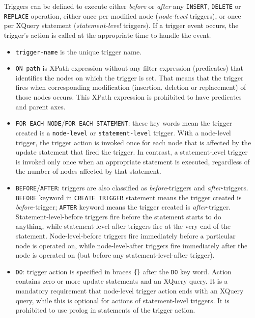 \documentclass[a4paper,12pt]{article}
\begin{document}
Triggers can be defined to execute either \emph{before} or \emph{after} any \verb!INSERT!, \verb!DELETE! or \verb!REPLACE! operation, either once per modified node (\emph{node-level} triggers), or once per XQuery statement (\emph{statement-level} triggers). If a trigger event occurs, the trigger's action is called at the appropriate time to handle the event.

\begin{itemize}
\item \verb!trigger-name! is the unique trigger name.

\item \verb!ON path! is XPath expression without any filter expression (predicates) that identifies the nodes on which the trigger is set. That means that the trigger fires when corresponding modification (insertion, deletion or replacement) of those nodes occurs. This XPath expression is prohibited to have predicates and parent axes.

\item \verb!FOR EACH NODE!/\verb!FOR EACH STATEMENT!: these key words mean the trigger created is a \verb!node-level! or \verb!statement-level! trigger. With a node-level trigger, the trigger action is invoked once for each node that is affected by the update statement that fired the trigger. In contrast, a statement-level trigger is invoked only once when an appropriate statement is executed, regardless of the number of nodes affected by that statement.

\item \verb!BEFORE!/\verb!AFTER!: triggers are also classified as \emph{before}-triggers and \emph{after}-triggers. \verb!BEFORE! keyword in \verb!CREATE TRIGGER! statement means the trigger created is \emph{before}-trigger; \verb!AFTER! keyword means the trigger created is \emph{after}-trigger. Statement-level-before triggers fire before the statement starts to do anything, while statement-level-after triggers fire at the very end of the statement. Node-level-before triggers fire immediately before a particular node is operated on, while node-level-after triggers fire immediately after the node is operated on (but before any statement-level-after trigger).

\item \verb!DO!: trigger action is specified in braces \verb!{}! after the \verb!DO! key word. Action contains zero or more update statements and an XQuery query. It is a mandatory requirement that node-level trigger action  ends with an XQuery query, while this is optional for actions of statement-level triggers. It is prohibited to use prolog in statements of the trigger action.


\end{itemize}
\end{document}

